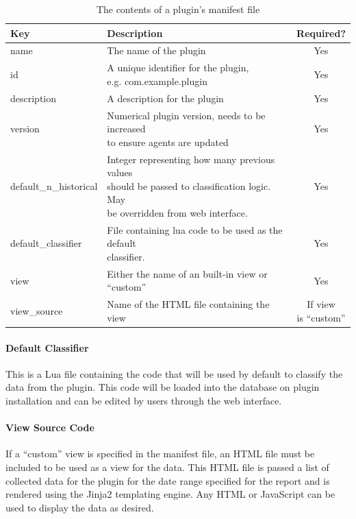 \documentclass[bsc,logo,twoside,parskip,singlespacing,notimes]{infthesis}
\begin{document}
\begin{table}[H]
	\centering
	\caption{The contents of a plugin's manifest file}
	\label{table-manifest-contents}
    \begin{tabular}{|l|l|c|}
    \hline
    \textbf{Key} & \textbf{Description} & \textbf{Required?} \\ \hline \hline
    name
    	& The name of the plugin
    	& Yes \\ \hline
    id
    	& \shortstack[l]{A unique identifier for the plugin,\\
    		e.g. com.example.plugin}
    	& Yes \\ \hline
    description
    	& A description for the plugin
    	& Yes \\ \hline
    version
    	& \shortstack[l]{Numerical plugin version, needs to be increased\\to ensure
    		agents are updated}
    	& Yes \\ \hline
    default\_n\_historical
    	& \shortstack[l]{Integer representing how many previous values \\
    		should be passed to classification logic. May\\be overridden from web interface.}
    	& Yes \\ \hline
    default\_classifier
    	& \shortstack[l]{File containing lua code to be used as the default\\
    		classifier.}
    	& Yes \\ \hline
    view
    	& Either the name of an built-in view or ``custom''
    	& Yes \\ \hline
    view\_source
    	& Name of the HTML file containing the view
    	& \shortstack[c]{If view\\is ``custom''} \\ \hline
    \end{tabular}
\end{table}

\paragraph*{Default Classifier}
	This is a Lua file containing the code that will be used by default to classify
	the data from the plugin.  This code will be loaded into the database on plugin
	installation and can be edited by users through the web interface.

\paragraph*{View Source Code}
	If a ``custom'' view is specified in the manifest file, an HTML file must be
	included to be used as a view for the data.  This HTML file is passed a list of
	collected data for the plugin for the date range specified for the report
	and is rendered using the Jinja2 templating engine.  Any HTML or JavaScript
	can be used to display the data as desired.
\end{document}
